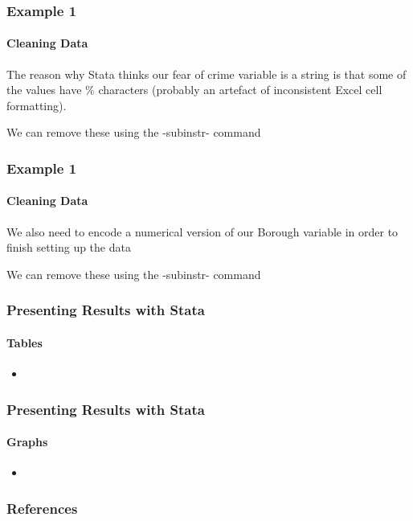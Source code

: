 \documentclass{beamer}
\begin{document}
\begin{frame}
  \frametitle{Example 1}
  \framesubtitle{Cleaning Data}
The reason why Stata thinks our fear of crime variable is a string is that some of the values have \% characters (probably an artefact of inconsistent Excel cell formatting).

\smallskip

We can remove these using the -subinstr- command


\end{frame}


\begin{frame}
  \frametitle{Example 1}
  \framesubtitle{Cleaning Data}
We also need to encode a numerical version of our Borough variable in order to finish setting up the data 



\smallskip

We can remove these using the -subinstr- command

%
\end{frame}



\begin{frame}
  \frametitle{Presenting Results with Stata}
  \framesubtitle{Tables}
  \begin{itemize}
    \item 
  \end{itemize}
\end{frame}

\begin{frame}
  \frametitle{Presenting Results with Stata}
  \framesubtitle{Graphs}
  \begin{itemize}
    \item 
  \end{itemize}
\end{frame}

\begin{frame}
  \frametitle{References}


\end{frame}
\end{document}
